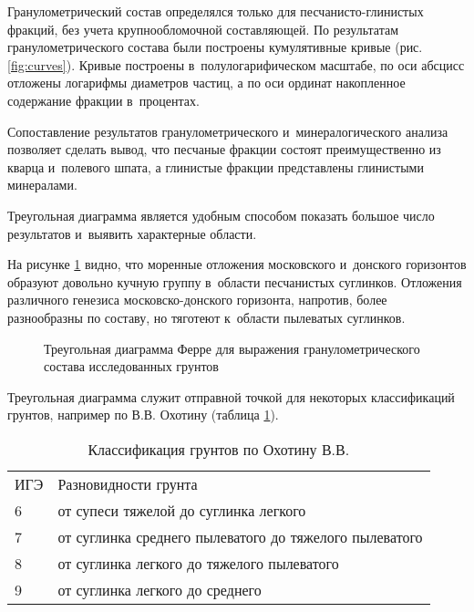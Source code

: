 Гранулометрический состав определялся только для песчанисто-глинистых фракций, без учета крупнообломочной составляющей.
По результатам гранулометрического состава были построены кумулятивные кривые (рис. \ref{fig:curves}).
Кривые построены в~полулогарифическом масштабе, 
по оси абсцисс отложены логарифмы диаметров частиц, 
а по оси ординат накопленное содержание фракции в~процентах.

{
\small

}

Сопоставление результатов гранулометрического и~минералогического анализа позволяет сделать вывод, 
что песчаные фракции состоят преимущественно из кварца и~полевого шпата, 
а глинистые фракции представлены глинистыми минералами.

Треугольная диаграмма является удобным способом показать большое число результатов и~выявить характерные области.

На рисунке \ref{Fig:Ferre} видно, что моренные отложения московского и~донского горизонтов образуют довольно кучную группу в~области песчанистых суглинков.
Отложения различного генезиса московско-донского горизонта, напротив, более разнообразны по составу, но тяготеют к~области 
пылеватых суглинков.

\begin{figure}[ht]
    \centering
    \small
    
    \caption{Треугольная диаграмма Ферре для выражения гранулометрического состава исследованных грунтов}
    \label{Fig:Ferre}
\end{figure}

Треугольная диаграмма служит отправной точкой для некоторых классификаций грунтов, например по В.\;В. Охотину (таблица \ref{tab:oxot}).

\begin{table}[ht]
    \centering
    \small
    \caption{Классификация грунтов по Охотину В.\:В.} \label{tab:oxot}
    \renewcommand*{\arraystretch}{1.2}
    \begin{tabular}{p{}l}
    ИГЭ & Разновидности грунта \\
    6 \dotfill &  от супеси тяжелой до суглинка легкого \\
    7 \dotfill &  от суглинка среднего пылеватого до тяжелого пылеватого \\
    8 \dotfill &  от суглинка легкого до тяжелого пылеватого \\
    9 \dotfill &  от суглинка легкого до среднего \\
    \end{tabular}
\end{table}

